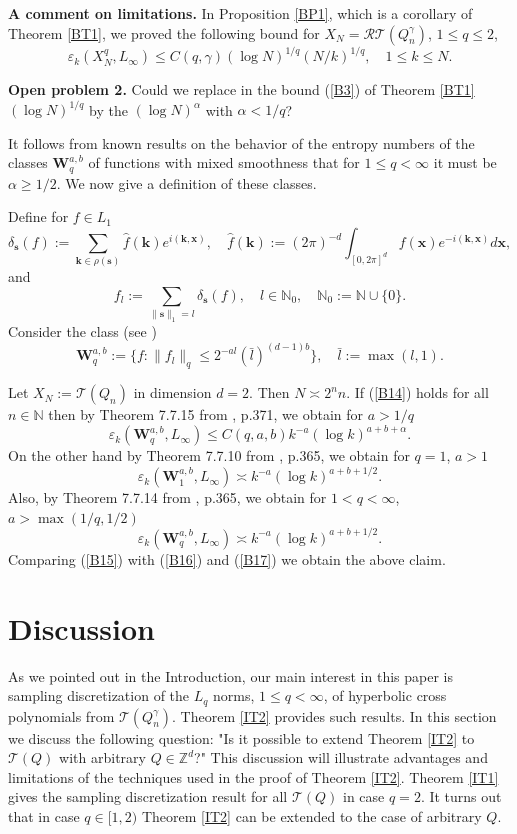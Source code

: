 \documentclass[12pt]{article}
\newcommand{\N}{{\mathbb{N}}}
\def \Tr{\mathcal T}
\def \cR{\mathcal R}
\def\Z{\mathbb Z}
\def \e{\varepsilon}
\def\ga{\gamma}
\def\bx{\mathbf x}
\def\bk{\mathbf k}
\def\bs{\mathbf s}
\def\bW{\mathbf W}
\numberwithin{equation}{section}
\newcommand{\be}{\begin{equation}}
\newcommand{\ee}{\end{equation}}
\begin{document}
 {\bf A comment on limitations.} In Proposition \ref{BP1}, which is a corollary of Theorem \ref{BT1}, we proved the following bound for $X_N =\cR\Tr(Q_n^\ga)$, $1\le q\le 2$,
 \be\label{B14} 
 \e_k(X^q_N,L_\infty) \le C(q,\ga)(\log N)^{1/q} (N/k)^{1/q}, \quad 1\le k \le N.
 \ee
 
 {\bf Open problem 2.} Could we replace in the bound (\ref{B3}) of Theorem \ref{BT1} $(\log N)^{1/q}$ by the $(\log N)^{\alpha}$ with $\alpha < 1/q$?
 
 It follows from known results on the behavior of the entropy numbers of the classes $\bW^{a,b}_q$ of functions with mixed smoothness that for $1\le q< \infty$ it must be $\alpha \ge 1/2$. We now give a definition of these classes.
 
  Define for $f\in L_1$
$$
\delta_\bs(f) := \sum_{\bk\in\rho(\bs)} \hat f(\bk) e^{i(\bk,\bx)}, \quad \hat f(\bk):= (2\pi)^{-d}\int_{[0,2\pi]^d} f(\bx)e^{-i(\bk,\bx)} d\bx,
$$
and
$$
f_l:=\sum_{\|\bs\|_1=l}\delta_\bs(f), \quad l\in \N_0,\quad \N_0:=\N\cup \{0\}.
$$
  Consider the class (see \cite{VT152})
$$
\bW^{a,b}_q:=\{f: \|f_l\|_q \le 2^{-al}(\bar l)^{(d-1)b}\},\quad \bar l:=\max(l,1).
$$

 Let $X_N := \Tr(Q_n)$ in dimension $d=2$. Then $N\asymp 2^nn$. If (\ref{B14}) holds for 
 all $n\in\N$ then by Theorem 7.7.15 from \cite{VTbookMA}, p.371, we obtain for $a>1/q$
 \be\label{B15}
 \e_k(\bW^{a,b}_q,L_\infty) \le C(q,a,b) k^{-a} (\log k)^{a+b +\alpha}.
 \ee
 On the other hand by Theorem 7.7.10 from  \cite{VTbookMA}, p.365, we obtain for $q=1$, $a>1$
  \be\label{B16}
 \e_k(\bW^{a,b}_1,L_\infty) \asymp k^{-a} (\log k)^{a+b +1/2}.
 \ee
 Also, by Theorem 7.7.14 from  \cite{VTbookMA}, p.365, we obtain for $1<q<\infty$, $a>\max(1/q,1/2)$
  \be\label{B17}
 \e_k(\bW^{a,b}_q,L_\infty) \asymp k^{-a} (\log k)^{a+b +1/2}.
 \ee
Comparing (\ref{B15}) with (\ref{B16}) and (\ref{B17}) we obtain the above claim. 


\section{Discussion}
\label{D}

As we pointed out in the Introduction, our main interest in this paper is sampling discretization of the $L_q$ norms, $1\le q<\infty$, of hyperbolic cross polynomials from $\Tr(Q_n^\ga)$. 
Theorem \ref{IT2} provides such results. In this section we discuss the following question: "Is it possible to extend Theorem \ref{IT2} to $\Tr(Q)$ with arbitrary $Q\in \Z^d$?" This discussion will illustrate advantages and limitations of the techniques used in the proof of Theorem \ref{IT2}. Theorem \ref{IT1} gives the sampling discretization result for all $\Tr(Q)$ in case $q=2$. It turns out that 
in case $q\in [1,2)$ Theorem \ref{IT2} can be extended to the case of arbitrary $Q$. 
\end{document}
